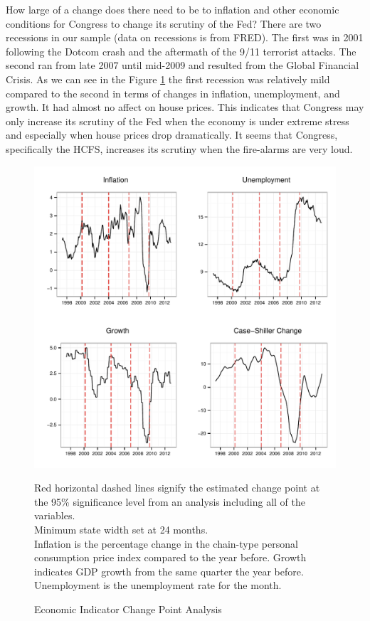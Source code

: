 \documentclass[a4paper]{article}\usepackage[]{graphicx}\usepackage[]{color}
\newenvironment{knitrout}{}{} %
\begin{document}
How large of a change does there need to be to inflation and other economic conditions for Congress to change its scrutiny of the Fed? There are two recessions in our sample (data on recessions is from FRED). The first was in 2001 following the Dotcom crash and the aftermath of the 9/11 terrorist attacks. The second ran from late 2007 until mid-2009 and resulted from the Global Financial Crisis. As we can see in the Figure \ref{fig:FullEconCP} the first recession was relatively mild compared to the second in terms of changes in inflation, unemployment, and growth. It had almost no affect on house prices. This indicates that Congress may only increase its scrutiny of the Fed when the economy is under extreme stress and especially when house prices drop dramatically. It seems that Congress, specifically the HCFS, increases its scrutiny when the fire-alarms are very loud.

\begin{figure}
    \caption{Economic Indicator Change Point Analysis}
    \label{fig:FullEconCP}
\begin{knitrout}
\color{fgcolor}

{\centering \includegraphics[width=0.8\linewidth]{figure/EconFullCP} 

}



\end{knitrout}
{\scriptsize{Red horizontal dashed lines signify the estimated change point at the 95\% significance level from an analysis including all of the variables.\\
Minimum state width set at 24 months. \\
Inflation is the percentage change in the chain-type personal consumption price index compared to the year before. Growth indicates GDP growth from the same quarter the year before. Unemployment is the unemployment rate for the month.}}
\end{figure}
\end{document}
